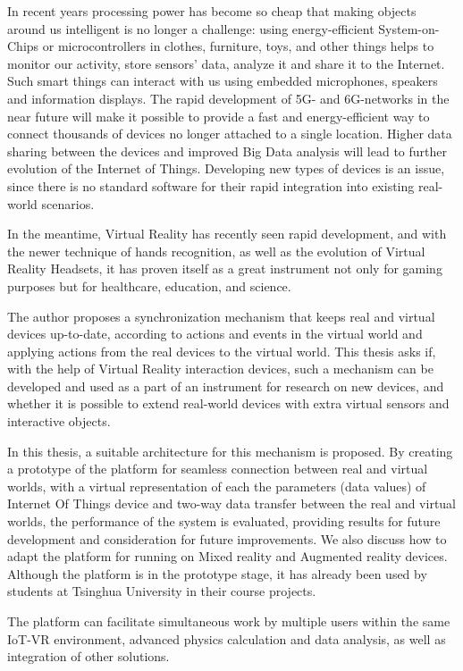 \begin{abstract*}

  In recent years processing power has become so cheap that making objects around us intelligent is no longer a challenge: using energy-efficient System-on-Chips or microcontrollers in clothes, furniture, toys, and other things helps to monitor our activity, store sensors' data, analyze it and share it to the Internet. Such smart things can interact with us using embedded microphones, speakers and information displays. The rapid development of 5G- and 6G-networks in the near future will make it possible to provide a fast and energy-efficient way to connect thousands of devices no longer attached to a single location. Higher data sharing between the devices and improved Big Data analysis will lead to further evolution of the Internet of Things. Developing new types of devices is an issue, since there is no standard software for their rapid integration into existing real-world scenarios.
   
  In the meantime, Virtual Reality has recently seen rapid development, and with the newer technique of hands recognition, as well as the evolution of Virtual Reality Headsets, it has proven itself as a great instrument not only for gaming purposes but for healthcare, education, and science.
   
  The author proposes a synchronization mechanism that keeps real and virtual devices up-to-date, according to actions and events in the virtual world and applying actions from the real devices to the virtual world. This thesis asks if, with the help of Virtual Reality interaction devices, such a mechanism can be developed and used as a part of an instrument for research on new devices, and whether it is possible to extend real-world devices with extra virtual sensors and interactive objects.
  
  In this thesis, a suitable architecture for this mechanism is proposed. By creating a prototype of the platform for seamless connection between real and virtual worlds, with a virtual representation of each the parameters (data values) of Internet Of Things device and two-way data transfer between the real and virtual worlds, the performance of the system is evaluated, providing results for future development and consideration for future improvements. We also discuss how to adapt the platform for running on Mixed reality and Augmented reality devices. Although the platform is in the prototype stage, it has already been used by students at Tsinghua University in their course projects. 
  
  The platform can facilitate simultaneous work by multiple users within the same IoT-VR environment, advanced physics calculation and data analysis, as well as integration of other solutions.
 


\end{abstract*}
